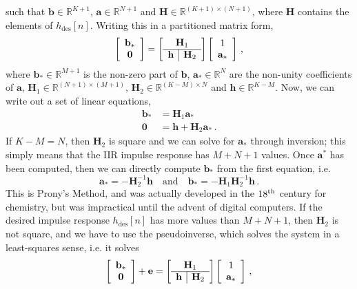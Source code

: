 %
such that $\mathbf{b}\in\mathbb{R}^{K+1}$, $\mathbf{a}\in\mathbb{R}^{N+1}$
and $\mathbf{H}\in\mathbb{R}^{(K+1)\times(N+1)}$, where $\mathbf{H}$
contains the elements of $h_\mathrm{des}[n]$. Writing this in a partitioned
matrix form,
%
\begin{displaymath}
  \left[\begin{array}{c}\mathbf{b}_* \\ \mathbf{0} \end{array}\right] =
  \left[\begin{array}{c|c}
      \multicolumn{2}{c}{\mathbf{H}_1} \\
      \hline
      \mathbf{h} & \mathbf{H}_2
    \end{array}\right]
  \left[\begin{array}{c}1 \\ \mathbf{a}_* \end{array}\right] \,,
\end{displaymath}
%
where $\mathbf{b}_*\in\mathbb{R}^{M+1}$ is the non-zero part of $\mathbf{b}$,
$\mathbf{a}_*\in\mathbb{R}^N$ are the non-unity coefficients of $\mathbf{a}$,
$\mathbf{H}_1\in\mathbb{R}^{(N+1)\times(M+1)}$,
$\mathbf{H}_2\in\mathbb{R}^{(K-M)\times N}$ and $\mathbf{h}\in\mathbb{R}^{K-M}$.
Now, we can write out a set of linear equations,
%
\begin{align*}
  \mathbf{b}_* &= \mathbf{H}_1\mathbf{a}_* \\
  \mathbf{0} &= \mathbf{h} + \mathbf{H}_2\mathbf{a}_* \,.
\end{align*}
%
If $K - M = N$, then $\mathbf{H}_2$ is square and we can solve for
$\mathbf{a}_*$ through inversion; this simply means that the IIR
impulse response has $M+N+1$ values. Once $\mathbf{a}^*$ has been
computed, then we can directly compute $\mathbf{b}_*$ from the
first equation, i.e.
%
\begin{displaymath}
  \mathbf{a}_* = -\mathbf{H}_2^{-1}\mathbf{h}
  \quad\mathrm{and}\quad
  \mathbf{b}_* = -\mathbf{H}_1\mathbf{H}_2^{-1}\mathbf{h} \,.
\end{displaymath}
%
This is Prony's Method, and was actually developed in the $18^\mathrm{th}\mkern1mu$
century for chemistry, but was impractical until the advent of
digital computers. If the desired impulse response $h_\mathrm{des}[n]$
has more values than $M+N+1$, then $\mathbf{H}_2$ is not square, and
we have to use the pseudoinverse, which solves the system in a least-squares
sense, i.e. it solves
%
\begin{displaymath}
  \left[\begin{array}{c}\mathbf{b}_* \\ \mathbf{0} \end{array}\right]
  + \mathbf{e} =
  \left[\begin{array}{c|c}
      \multicolumn{2}{c}{\mathbf{H}_1} \\
      \hline
      \mathbf{h} & \mathbf{H}_2
    \end{array}\right]
  \left[\begin{array}{c}1 \\ \mathbf{a}_* \end{array}\right] \,,
\end{displaymath}
